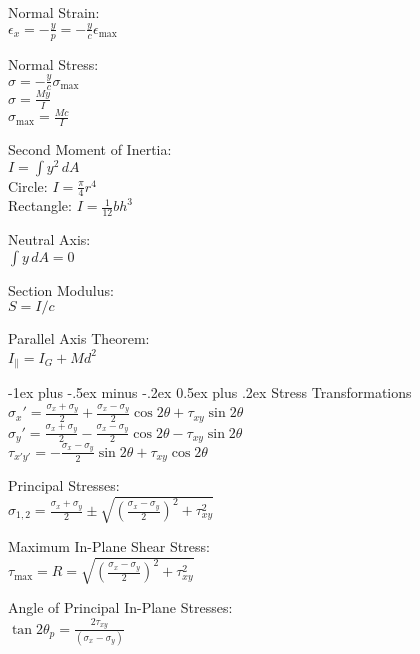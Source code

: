 \documentclass[10pt,landscape]{article}
\makeatletter
\renewcommand{\section}{\@startsection{section}{1}{0mm}%
                                {-1ex plus -.5ex minus -.2ex}%
                                {0.5ex plus .2ex}%
                                {\normalfont\large\bfseries}}
\newcommand{\tab}{\hspace{.02\textwidth}}
\newcommand{\ds}{\displaystyle}
\makeatother
\begin{document}
\begin{multicols}{3}
Normal Strain:\\
\vspace{1mm}
\tab $\ds \epsilon_{x} = -\frac{y}{p} = -\frac{y}{c}\epsilon_{\text{max}}$

Normal Stress:\\
\vspace{1mm}
\tab $\ds \sigma = -\frac{y}{c}\sigma_{\text{max}}$\\
\vspace{1mm}
\tab $\ds \sigma = \frac{My}{I}$\\
\vspace{1mm}
\tab $\ds \sigma_{\text{max}} = \frac{Mc}{I}$

Second Moment of Inertia:\\
\tab $I = \int y^2\,dA$\\
\tab Circle: $\ds I = \frac{\pi}{4}r^4$\\
\tab Rectangle: $\ds I = \frac{1}{12}bh^3$

Neutral Axis:\\
\tab $\int y\,dA = 0$

Section Modulus:\\
\tab $S = I/c$

Parallel Axis Theorem:\\
\tab $I_{\parallel} = I_G + Md^2$

\section{Stress Transformations}
\tab $\ds \sigma_x' = \frac{\sigma_x + \sigma_y}{2}	+ \frac{\sigma_x - \sigma_y}{2}\cos2\theta + \tau_{xy}\sin2\theta$
\\[2mm]
\tab $\ds \sigma_y' = \frac{\sigma_x + \sigma_y}{2}	- \frac{\sigma_x - \sigma_y}{2}\cos2\theta - \tau_{xy}\sin2\theta$
\\[2mm]
\tab $\ds \tau_{x'y'} = -\frac{\sigma_x - \sigma_y}{2}\sin2\theta + \tau_{xy}\cos2\theta$

Principal Stresses:\\
\tab $\ds \sigma_{1,2} = \frac{\sigma_x + \sigma _y}{2} \pm \sqrt{\left(\frac{\sigma_x - \sigma_y}{2}\right)^2 + \tau_{xy}^2}$

Maximum In-Plane Shear Stress:\\
\vspace{1mm}
\tab $\ds \tau_{\text{max}} = R = \sqrt{\left(\frac{\sigma_x - \sigma_y}{2}\right)^2 + \tau_{xy}^2}$

Angle of Principal In-Plane Stresses:\\
\tab $\ds \tan 2\theta_p = \frac{2\tau_{xy}}{(\sigma_x - \sigma_y)}$


\end{multicols}
\end{document}
